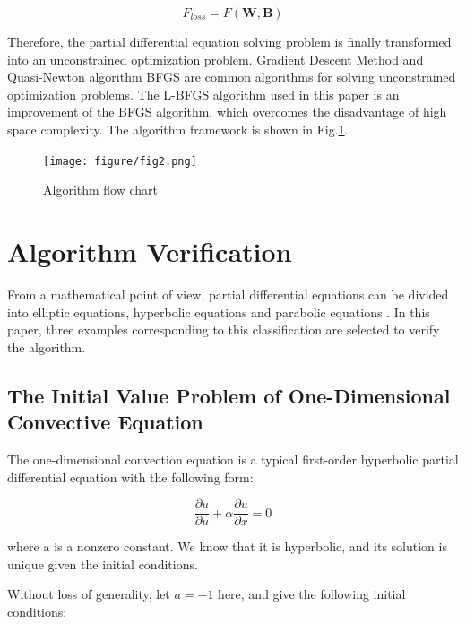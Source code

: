 \documentclass[10pt,journal,compsoc]{IEEEtran}
\begin{document}
\begin{equation}
F_{loss} = F(\mathbf{W,B})
\label{equ_12}
\end{equation}

Therefore, the partial differential equation solving problem is finally transformed into an unconstrained optimization problem. Gradient Descent Method and Quasi-Newton algorithm BFGS are common algorithms for solving unconstrained optimization problems\cite{ruder2016}\cite{nocedal1980}. The L-BFGS algorithm used in this paper is an improvement of the BFGS algorithm, which overcomes the disadvantage of high space complexity\cite{nocedal1980}. The algorithm framework is shown in Fig.\ref{fig_2}.



\begin{figure}[!t]
\centering
\texttt{[image: figure/fig2.png]}
\caption{Algorithm flow chart}
\centering
\label{fig_2}
\end{figure}

\section{Algorithm Verification}

From a mathematical point of view, partial differential equations can be divided into elliptic equations, hyperbolic equations and parabolic equations \cite{logan2014}. In this paper, three examples corresponding to this classification are selected to verify the algorithm.

\subsection{The Initial Value Problem of One-Dimensional Convective Equation}

The one-dimensional convection equation is a typical first-order hyperbolic partial differential equation with the following form:


\begin{equation}
\dfrac{\partial u}{\partial u} + \alpha \dfrac{\partial u}{\partial x} = 0
\label{equ_13}
\end{equation}

where a is a nonzero constant. We know that it is hyperbolic, and its solution is unique given the initial conditions.

Without loss of generality, let $a=-1$ here, and give the following initial conditions:
\end{document}
